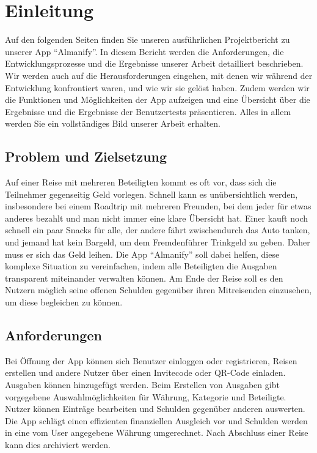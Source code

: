 \section{ Einleitung}

Auf den folgenden Seiten finden Sie unseren ausführlichen Projektbericht zu unserer App \enquote{Almanify}. 
In diesem Bericht werden die Anforderungen, die Entwicklungsprozesse und die Ergebnisse unserer Arbeit detailliert beschrieben. 
Wir werden auch auf die Herausforderungen eingehen, mit denen wir während der Entwicklung konfrontiert waren, und wie wir sie gelöst haben. 
Zudem werden wir die Funktionen und Möglichkeiten der App aufzeigen und eine Übersicht über die Ergebnisse und die Ergebnisse der Benutzertests präsentieren. 
Alles in allem werden Sie ein vollständiges Bild unserer Arbeit erhalten.

\subsection{ Problem und Zielsetzung}

Auf einer Reise mit mehreren Beteiligten kommt es oft vor, dass sich die Teilnehmer gegenseitig Geld vorlegen. 
Schnell kann es unübersichtlich werden, insbesondere bei einem Roadtrip mit mehreren Freunden, 
bei dem jeder für etwas anderes bezahlt und man nicht immer eine klare Übersicht hat. 
Einer kauft noch schnell ein paar Snacks für alle, der andere fährt zwischendurch das Auto tanken, 
und jemand hat kein Bargeld, um dem Fremdenführer Trinkgeld zu geben. Daher muss er sich das Geld leihen. 
Die App \enquote{Almanify} soll dabei helfen, diese komplexe Situation zu vereinfachen, indem alle Beteiligten die Ausgaben transparent miteinander verwalten können. Am Ende der Reise soll es den Nutzern möglich seine offenen Schulden gegenüber ihren Mitreisenden einzusehen, um diese begleichen zu können.

\subsection{Anforderungen}

Bei Öffnung der App können sich Benutzer einloggen oder registrieren, Reisen erstellen und andere Nutzer über einen Invitecode oder QR-Code einladen. Ausgaben können hinzugefügt werden. Beim Erstellen von Ausgaben gibt vorgegebene Auswahlmöglichkeiten für Währung, Kategorie und Beteiligte. Nutzer können Einträge bearbeiten und Schulden gegenüber anderen auswerten. Die App schlägt einen effizienten finanziellen Ausgleich vor und Schulden werden in eine vom User angegebene Währung umgerechnet. Nach Abschluss einer Reise kann dies archiviert werden.

